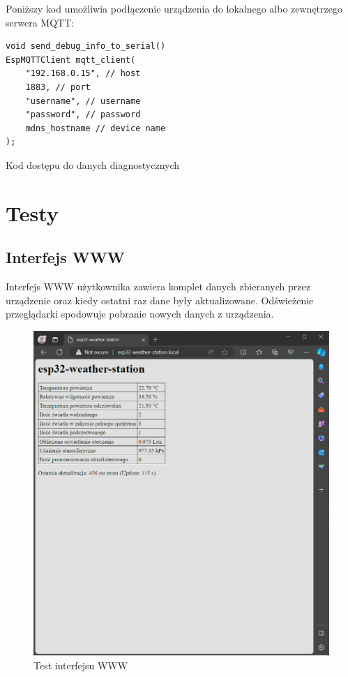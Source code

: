 \documentclass[12pt,a4paper]{article}
\begin{document}
Poniższy kod umożliwia podłączenie urządzenia do lokalnego albo zewnętrzego serwera MQTT: 
\begin{code}[H]
\begin{verbatim}
void send_debug_info_to_serial()
EspMQTTClient mqtt_client(
    "192.168.0.15", // host
    1883, // port
    "username", // username
    "password", // password
    mdns_hostname // device name
);
\end{verbatim}
\caption{Kod dostępu do danych diagnostycznych}
\label{diagnostic-data-code}
\end{code}

\section{Testy}

\subsection{Interfejs WWW}
Interfejs WWW użytkownika zawiera komplet danych zbieranych przez urządzenie oraz kiedy ostatni raz dane były aktualizowane. 
Odświeżenie przeglądarki spodowuje pobranie nowych danych z urządzenia.
\begin{figure}[H]
    \centering
    \includegraphics[width=\textwidth]{web-interface.png}
    \caption{Test interfejsu WWW}
\end{figure}
\end{document}
